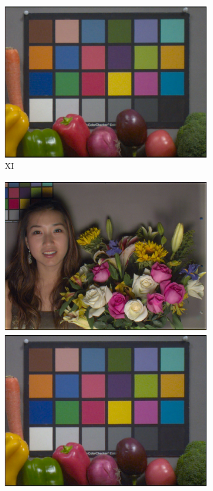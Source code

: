 \documentclass[]{spie}
\begin{document}
\begin{figure}
\begin{center}
\begin{subfigure}[b]{0.3\textwidth}
    \includegraphics[width=\textwidth]{VeggieTunXI}
    \caption{XI}
\end{subfigure}
\begin{subfigure}[b]{0.3\textwidth}
    \includegraphics[width=\textwidth]{FaceTunSI}
    \includegraphics[width=\textwidth]{VeggieTunSI}

\end{subfigure}
\end{center}
\end{figure}
\end{document}
